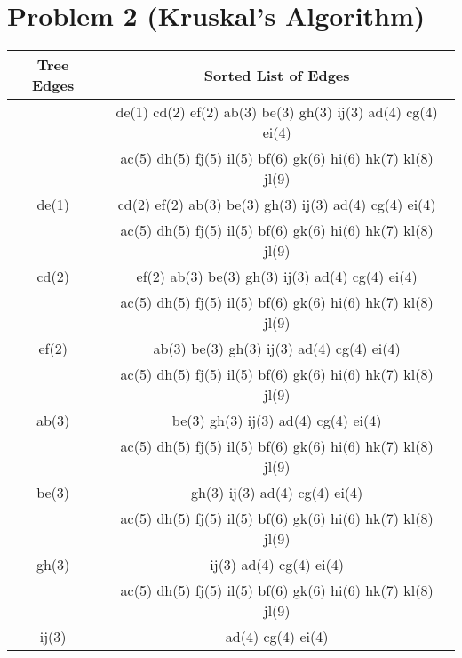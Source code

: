 \documentclass{article}
\begin{document}
\newpage

\section*{Problem 2 (Kruskal's Algorithm)}
\begin{table}[ht]
    \centering
    \begin{tabular}{|c|c|}
        \hline
        \textbf{Tree Edges} & \textbf{Sorted List of Edges}                               \\
        \hline
                            & de(1) cd(2) ef(2) ab(3) be(3) gh(3) ij(3) ad(4) cg(4) ei(4) \\
                            & ac(5) dh(5) fj(5) il(5) bf(6) gk(6) hi(6) hk(7) kl(8) jl(9) \\
        \hline
        de(1)               & cd(2) ef(2) ab(3) be(3) gh(3) ij(3) ad(4) cg(4) ei(4)       \\
                            & ac(5) dh(5) fj(5) il(5) bf(6) gk(6) hi(6) hk(7) kl(8) jl(9) \\
        \hline
        cd(2)               & ef(2) ab(3) be(3) gh(3) ij(3) ad(4) cg(4) ei(4)             \\
                            & ac(5) dh(5) fj(5) il(5) bf(6) gk(6) hi(6) hk(7) kl(8) jl(9) \\
        \hline
        ef(2)               & ab(3) be(3) gh(3) ij(3) ad(4) cg(4) ei(4)                   \\
                            & ac(5) dh(5) fj(5) il(5) bf(6) gk(6) hi(6) hk(7) kl(8) jl(9) \\
        \hline
        ab(3)               & be(3) gh(3) ij(3) ad(4) cg(4) ei(4)                         \\
                            & ac(5) dh(5) fj(5) il(5) bf(6) gk(6) hi(6) hk(7) kl(8) jl(9) \\
        \hline
        be(3)               & gh(3) ij(3) ad(4) cg(4) ei(4)                               \\
                            & ac(5) dh(5) fj(5) il(5) bf(6) gk(6) hi(6) hk(7) kl(8) jl(9) \\
        \hline
        gh(3)               & ij(3) ad(4) cg(4) ei(4)                                     \\
                            & ac(5) dh(5) fj(5) il(5) bf(6) gk(6) hi(6) hk(7) kl(8) jl(9) \\
        \hline
        ij(3)               & ad(4) cg(4) ei(4)                                           \\

\end{tabular}
\end{table}
\end{document}
